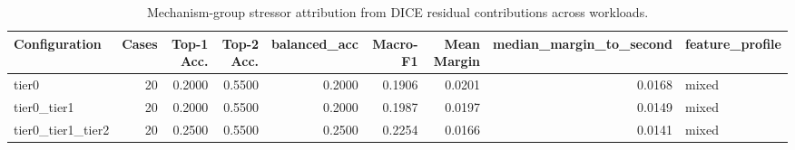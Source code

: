 \begin{table}[t]
\centering
\caption{Mechanism-group stressor attribution from DICE residual contributions across workloads.}
\label{tab:dice_stressor_diagnosis}
\footnotesize
\begin{tabular}{lrrrrrrrl}
\toprule
Configuration & Cases & Top-1 Acc. & Top-2 Acc. & balanced_acc & Macro-F1 & Mean Margin & median_margin_to_second & feature_profile \\
\midrule
tier0 & 20 & 0.2000 & 0.5500 & 0.2000 & 0.1906 & 0.0201 & 0.0168 & mixed \\
tier0_tier1 & 20 & 0.2000 & 0.5500 & 0.2000 & 0.1987 & 0.0197 & 0.0149 & mixed \\
tier0_tier1_tier2 & 20 & 0.2500 & 0.5500 & 0.2500 & 0.2254 & 0.0166 & 0.0141 & mixed \\
\bottomrule
\end{tabular}

\end{table}
